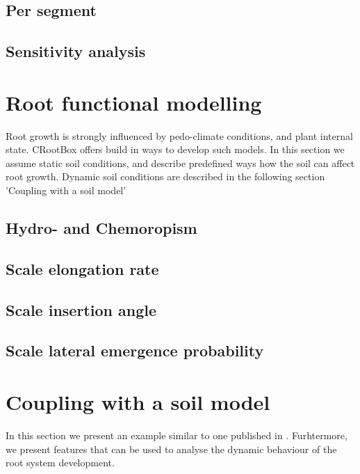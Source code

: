 \documentclass[a4paper]{article}
\begin{document}
\subsection{Per segment}

\subsection{Sensitivity analysis} \label{sec:sa}



\section{Root functional modelling}

Root growth is strongly influenced by pedo-climate conditions, and plant internal state. 
CRootBox offers build in ways to develop such models. 
In this section we assume static soil conditions, and describe predefined ways how the soil can affect root growth.
Dynamic soil conditions are described in the following section 'Coupling with a soil model'

\subsection{Hydro- and Chemoropism}

\subsection{Scale elongation rate}

\subsection{Scale insertion angle}

\subsection{Scale lateral emergence probability}



\section{Coupling with a soil model}

In this section we present an example similar to one published in . 
Furhtermore, we present features that can be used to analyse the dynamic behaviour of the root system development.
\end{document}
